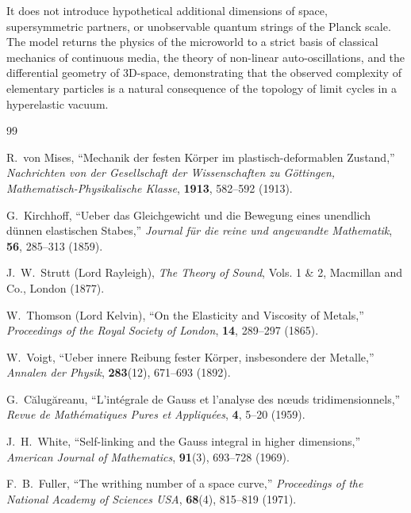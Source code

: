 \documentclass[12pt,a4paper]{article}
\begin{document}
		It does not introduce hypothetical additional dimensions of space, supersymmetric partners, or unobservable quantum strings of the Planck scale. The model returns the physics of the microworld to a strict basis of classical mechanics of continuous media, the theory of non-linear auto-oscillations, and the differential geometry of 3D-space, demonstrating that the observed complexity of elementary particles is a natural consequence of the topology of limit cycles in a hyperelastic vacuum.
		
		\begin{thebibliography}{99}
			
			R.~von Mises, 
			``Mechanik der festen K{\"o}rper im plastisch-deformablen Zustand,''
			\textit{Nachrichten von der Gesellschaft der Wissenschaften zu G{\"o}ttingen, Mathematisch-Physikalische Klasse}, \textbf{1913}, 582--592 (1913).
			
			G.~Kirchhoff, 
			``Ueber das Gleichgewicht und die Bewegung eines unendlich d{\"u}nnen elastischen Stabes,''
			\textit{Journal f{\"u}r die reine und angewandte Mathematik}, \textbf{56}, 285--313 (1859).
			
			J.~W.~Strutt (Lord Rayleigh), 
			\textit{The Theory of Sound}, Vols. 1 \& 2, 
			Macmillan and Co., London (1877).
			
			W.~Thomson (Lord Kelvin), 
			``On the Elasticity and Viscosity of Metals,''
			\textit{Proceedings of the Royal Society of London}, \textbf{14}, 289--297 (1865).
			
			W.~Voigt, 
			``Ueber innere Reibung fester K{\"o}rper, insbesondere der Metalle,''
			\textit{Annalen der Physik}, \textbf{283}(12), 671--693 (1892).
			
			G.~C{\u{a}}lug{\u{a}}reanu, 
			``L'int{\'e}grale de Gauss et l'analyse des n{\oe}uds tridimensionnels,''
			\textit{Revue de Math{\'e}matiques Pures et Appliqu{\'e}es}, \textbf{4}, 5--20 (1959).
			
			J.~H.~White, 
			``Self-linking and the Gauss integral in higher dimensions,''
			\textit{American Journal of Mathematics}, \textbf{91}(3), 693--728 (1969).
			
			F.~B.~Fuller, 
			``The writhing number of a space curve,''
			\textit{Proceedings of the National Academy of Sciences USA}, \textbf{68}(4), 815--819 (1971).
			

\end{thebibliography}
\end{document}
